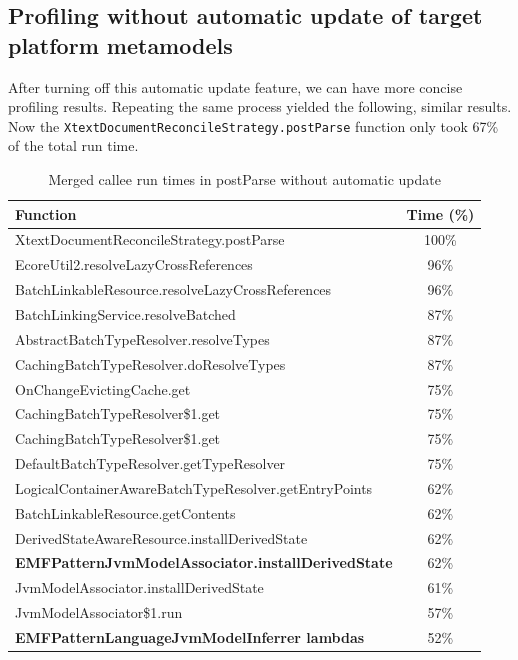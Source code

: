 \documentclass[11pt,a4paper,oneside]{report}
\begin{document}
\pagebreak
\subsection{Profiling without automatic update of target platform metamodels}
After turning off this automatic update feature, we can have more concise
profiling results. Repeating the same process yielded the following, similar
results. Now the \texttt{XtextDocumentReconcileStrategy.postParse} function only
took 67\% of the total run time.

\begin{table}[ht]
    \footnotesize
    \centering
    \begin{tabular}{ l c }
        \toprule
        Function & Time (\%) \\
        \midrule
        XtextDocumentReconcileStrategy.postParse & 100\% \\
        EcoreUtil2.resolveLazyCrossReferences & 96\% \\
        BatchLinkableResource.resolveLazyCrossReferences & 96\% \\
        BatchLinkingService.resolveBatched & 87\% \\
        AbstractBatchTypeResolver.resolveTypes & 87\% \\
        CachingBatchTypeResolver.doResolveTypes & 87\% \\
        OnChangeEvictingCache.get & 75\% \\
        CachingBatchTypeResolver\$1.get & 75\% \\
        CachingBatchTypeResolver\$1.get & 75\% \\
        DefaultBatchTypeResolver.getTypeResolver & 75\% \\
        LogicalContainerAwareBatchTypeResolver.getEntryPoints & 62\% \\
        BatchLinkableResource.getContents & 62\% \\
        DerivedStateAwareResource.installDerivedState & 62\% \\
        \textbf{EMFPatternJvmModelAssociator.installDerivedState} & 62\% \\
        JvmModelAssociator.installDerivedState & 61\% \\
        JvmModelAssociator\$1.run & 57\% \\
        \textbf{EMFPatternLanguageJvmModelInferrer lambdas} & 52\% \\
        \bottomrule
    \end{tabular}
    \caption{Merged callee run times in postParse without automatic update}
    \label{tab:postparse-no-auto-update}
\end{table}
\end{document}
